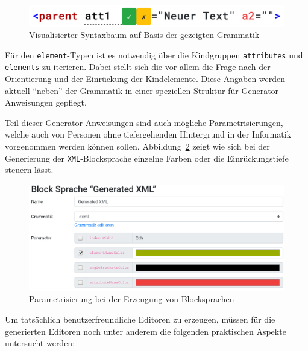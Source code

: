 \documentclass[paper=a4,fontsize=12pt,parskip=half]{scrartcl}
\begin{document}
\begin{figure}[h]
  \centering\includegraphics[width=\linewidth]{screenshot-generated-xml.png}
  \caption{Visualisierter Syntaxbaum auf Basis der gezeigten Grammatik}
  \label{fig:example-xml-generated}
\end{figure}

Für den \texttt{element}-Typen ist es notwendig über die Kindgruppen \texttt{attributes} und \texttt{elements} zu iterieren. Dabei stellt sich die vor allem die Frage nach der Orientierung und der Einrückung der Kindelemente. Diese Angaben werden aktuell \enquote{neben} der Grammatik in einer speziellen Struktur für Generator-Anweisungen gepflegt.

Teil dieser Generator-Anweisungen sind auch mögliche Parametrisierungen, welche auch von Personen ohne tiefergehenden Hintergrund in der Informatik vorgenommen werden können sollen. Abbildung~\ref{fig:block-lang-generation-parameters} zeigt wie sich bei der Generierung der \texttt{XML}-Blocksprache einzelne Farben oder die Einrückungstiefe steuern lässt.

\begin{figure}[h]
  \centering\includegraphics[width=\linewidth, frame]{screenshot-generation-parameters.png}
  \caption{Parametrisierung bei der Erzeugung von Blocksprachen}
  \label{fig:block-lang-generation-parameters}
\end{figure}

Um tatsächlich benutzerfreundliche Editoren zu erzeugen, müssen für die generierten Editoren noch  unter anderem die folgenden praktischen Aspekte untersucht werden:
\end{document}
